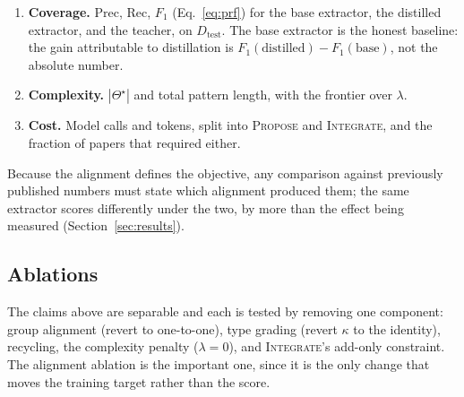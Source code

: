 \begin{enumerate}
  \item \textbf{Coverage.} $\mathrm{Prec}$, $\mathrm{Rec}$, $F_1$
    (Eq.~\ref{eq:prf}) for the base extractor, the distilled extractor, and the
    teacher, on $D_{\mathrm{test}}$. The base extractor is the honest baseline:
    the gain attributable to distillation is $F_1(\text{distilled}) -
    F_1(\text{base})$, not the absolute number.
  \item \textbf{Complexity.} $|\Theta^\star|$ and total pattern length, with the
    frontier over $\lambda$.
  \item \textbf{Cost.} Model calls and tokens, split into \textsc{Propose} and
    \textsc{Integrate}, and the fraction of papers that required either.
\end{enumerate}

Because the alignment defines the objective, any comparison against previously
published numbers must state which alignment produced them; the same extractor
scores differently under the two, by more than the effect being measured
(Section~\ref{sec:results}).

\subsection{Ablations}
\label{sec:ablations}

The claims above are separable and each is tested by removing one component:
group alignment (revert to one-to-one), type grading (revert $\kappa$ to the
identity), recycling, the complexity penalty ($\lambda = 0$), and
\textsc{Integrate}'s add-only constraint. The alignment ablation is the
important one, since it is the only change that moves the training target rather
than the score.

